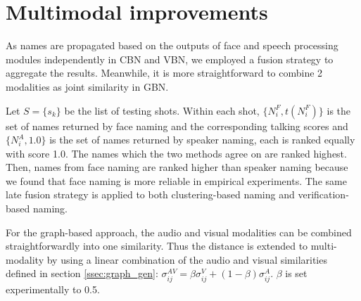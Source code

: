 \section{Multimodal improvements}
\label{sec:multimodal}

As names are propagated based on the outputs of face and speech processing modules independently in CBN and VBN, we employed a fusion strategy to aggregate the results. Meanwhile, it is more straightforward to combine 2 modalities as joint similarity in GBN.

 Let $S = \{s_k\}$ be the list of testing shots. Within each shot, $\{N^F_i, t(N^F_i)\}$ is the set of names returned by face naming and the corresponding talking scores and $\{N^A_i, 1.0\}$  is the set of names returned by speaker naming, each is ranked equally with score 1.0.
%
The names which the two methods agree on are ranked highest. 
%
Then, names from face naming are ranked higher than speaker naming  because we found that face naming is more reliable in empirical experiments.
%
%
The same late fusion strategy is applied to both clustering-based naming and verification-based naming.

 For the graph-based approach, the audio and visual modalities can be combined straightforwardly into one similarity.
%
Thus the distance is extended to multi-modality by using a linear combination of the audio and visual similarities defined in section \ref{ssec:graph_gen}: $\sigma^{AV}_{ij} = \beta \sigma^V_{ij} + (1-\beta) \sigma^A_{ij}$. $\beta$ is set experimentally to 0.5.

\endinput

\begin{algorithm}
  \caption{Ranking names within shots
    \label{algo:ranking}}
  \begin{algorithmic}[1]
	  \For{$s_k \in S$}
 	  	    \State{$Q_{s_k} = \emptyset$}
		    \State{Face\_naming$(s_k) \Rightarrow (N^F_i, t(N^F_i))$}
				\State{Speaker\_naming$(s_k) \Rightarrow (N^A_j, 1.0)$}
				\For{each $N^F_i$}
					\If{$\exists N^A_j / N^A_j = N^F_i$}
						\State{$Q_{s_k} = Q_{s_k} \cup \{(N^F_i, t(N^F_i) + 2.0)\}$}
					\Else
						\State{$Q_{s_k} = Q_{s_k} \cup \{(N^F_i, t(N^F_i) + 1.0)\}$}
					\EndIf
				\EndFor
				\For{each $N^A_j$}
					\If{not $\exists N^F_i / N^F_i = N^A_j$}
						\State{$Q_{s_k} = Q_{s_k} \cup \{(N^A_j, 1.0)\}$}
					\EndIf
				\EndFor
		\EndFor
  \end{algorithmic}
\end{algorithm}
%